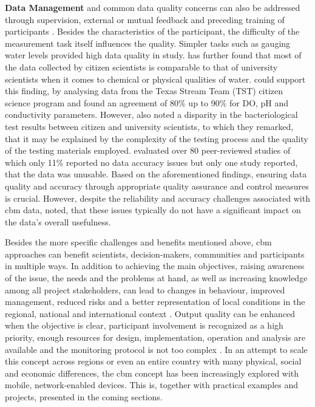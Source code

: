 \textbf{Data Management} and common data quality concerns can also be addressed through supervision, external or mutual feedback and preceding training of participants \autocite{albusAccuracyLongtermVolunteer2020,baalbakiCitizenScienceLebanon2019,fraislCitizenScienceEnvironmental2022}. Besides the characteristics of the participant, the difficulty of the measurement task itself influences the quality. Simpler tasks such as gauging water levels provided high data quality in \autocite{weeserCitizenSciencePioneers2018a} study. \autocite{baalbakiCitizenScienceLebanon2019} has further found that most of the data collected by citizen scientists is comparable to that of university scientists when it comes to chemical or physical qualities of water. \autocite{albusAccuracyLongtermVolunteer2020} could support this finding, by analysing data from the Texas Stream Team (TST) citizen science program and found an agreement of 80\% up to 90\% for DO, pH and conductivity parameters. However, \autocite{baalbakiCitizenScienceLebanon2019} also noted a disparity in the bacteriological test results between citizen and university scientists, to which they remarked, that it may be explained by the complexity of the testing process and the quality of the testing materials employed. \autocite{aceves-buenoCitizenScienceApproach2015} evaluated over 80 peer-reviewed studies of which only 11\% reported no data accuracy issues but only one study reported, that the data was unusable. Based on the aforementioned findings, ensuring data quality and accuracy through appropriate quality assurance and control measures is crucial. However, despite the reliability and accuracy challenges associated with \acrshort{cbm} data, \autocite{aceves-buenoCitizenScienceApproach2015} noted, that these issues typically do not have a significant impact on the data's overall usefulness.

Besides the more specific challenges and benefits mentioned above, \acrlong{cbm} approaches can benefit scientists, decision-makers, communities and participants in multiple ways. In addition to achieving the main objectives, raising awareness of the issue, the needs and the problems at hand, as well as increasing knowledge among all project stakeholders, can lead to changes in behaviour, improved management, reduced risks and a better representation of local conditions in the regional, national and international context \autocite{huangManagementDrinkingWater2020,walkerBenefitsNegativeImpacts2021}. Output quality can be enhanced when the objective is clear, participant involvement is recognized as a high priority, enough resources for design, implementation, operation and analysis are available and the monitoring protocol is not too complex \autocite{butteFrameworkWaterSecurity2022, pocockStrategicFrameworkSupport}.\newline
In an attempt to scale this concept across regions or even an entire country with many physical, social and economic differences, the \acrshort{cbm} concept has been increasingly explored with mobile, network-enabled devices. This is, together with practical examples and projects, presented in the coming sections.

